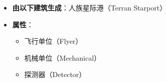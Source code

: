 \begin{tcolorbox}[colback=white, colframe=black!60!white, title=Terran\_Science\_Vessel(), arc=0mm]
    \begin{itemize}
        \item \textbf{由以下建筑生成}：人族星际港（Terran Starport）
        \item \textbf{属性}：
            \begin{itemize}
                \item 飞行单位（Flyer）
                \item 机械单位（Mechanical）
                \item 探测器（Detector）
            \end{itemize}
    \end{itemize}
\end{tcolorbox}

